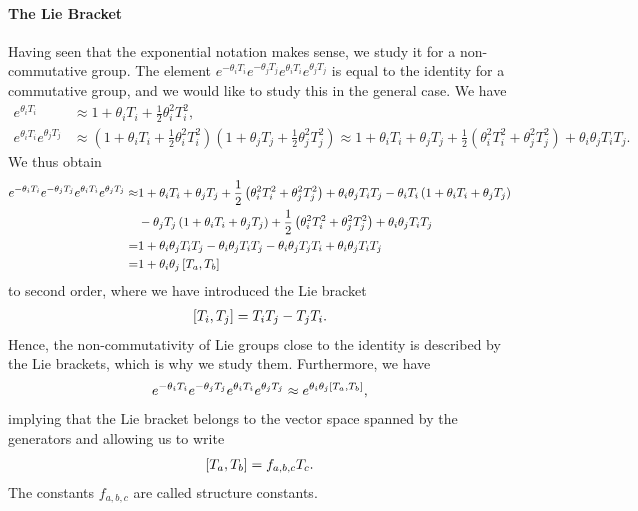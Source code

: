 \paragraph{The Lie Bracket}
Having seen that the exponential notation makes sense, we study it for a non-commutative group. The element $e^{-\theta_{i}T_{i}}e^{-\theta_{j}T_{j}}e^{\theta_{i}T_{i}}e^{\theta_{j}T_{j}}$ is equal to the identity for a commutative group, and we would like to study this in the general case. We have
\begin{align*}
	e^{\theta_{i}T_{i}}                    &\approx 1 + \theta_{i}T_{i} + \frac{1}{2}\theta_{i}^{2}T_{i}^{2}, \\
	e^{\theta_{i}T_{i}}e^{\theta_{j}T_{j}} &\approx \left(1 + \theta_{i}T_{i} + \frac{1}{2}\theta_{i}^{2}T_{i}^{2}\right)\left(1 + \theta_{j}T_{j} + \frac{1}{2}\theta_{j}^{2}T_{j}^{2}\right) \approx 1 + \theta_{i}T_{i} + \theta_{j}T_{j} + \frac{1}{2}\left(\theta_{i}^{2}T_{i}^{2} + \theta_{j}^{2}T_{j}^{2}\right) + \theta_{i}\theta_{j}T_{i}T_{j}.
\end{align*}
We thus obtain
\begin{align*}
	e^{-\theta_{i}T_{i}}e^{-\theta_{j}T_{j}}e^{\theta_{i}T_{i}}e^{\theta_{j}T_{j}} \approx& 1 + \theta_{i}T_{i} + \theta_{j}T_{j} + \frac{1}{2}\left(\theta_{i}^{2}T_{i}^{2} + \theta_{j}^{2}T_{j}^{2}\right) + \theta_{i}\theta_{j}T_{i}T_{j} - \theta_{i}T_{i}\left(1 + \theta_{i}T_{i} + \theta_{j}T_{j}\right) \\
	 &- \theta_{j}T_{j}\left(1 + \theta_{i}T_{i} + \theta_{j}T_{j}\right) + \frac{1}{2}\left(\theta_{i}^{2}T_{i}^{2} + \theta_{j}^{2}T_{j}^{2}\right) + \theta_{i}\theta_{j}T_{i}T_{j} \\
	=& 1 + \theta_{i}\theta_{j}T_{i}T_{j} - \theta_{i}\theta_{j}T_{i}T_{j} - \theta_{i}\theta_{j}T_{j}T_{i} + \theta_{i}\theta_{j}T_{i}T_{j} \\
	=& 1 + \theta_{i}\theta_{j}\left[T_{a}, T_{b}\right]
\end{align*}
to second order, where we have introduced the Lie bracket
\begin{align*}
	\left[T_{i}, T_{j}\right] = T_{i}T_{j} - T_{j}T_{i}.
\end{align*}
Hence, the non-commutativity of Lie groups close to the identity is described by the Lie brackets, which is why we study them. Furthermore, we have
\begin{align*}
	e^{-\theta_{i}T_{i}}e^{-\theta_{j}T_{j}}e^{\theta_{i}T_{i}}e^{\theta_{j}T_{j}} \approx e^{\theta_{i}\theta_{j}\left[T_{a}, T_{b}\right]},
\end{align*}
implying that the Lie bracket belongs to the vector space spanned by the generators and allowing us to write
\begin{align*}
	\left[T_{a}, T_{b}\right] = f_{a, b, c}T_{c}.
\end{align*}
The constants $f_{a, b, c}$ are called structure constants.

